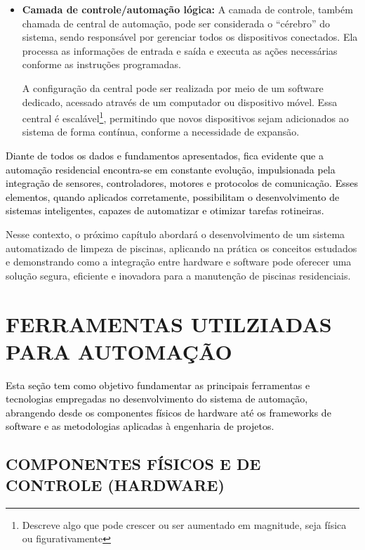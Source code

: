 \begin{itemize}
            \item \textbf{Camada de controle/automação lógica:} 
                A camada de controle, também chamada de central de automação, pode ser considerada o “cérebro” do sistema, sendo responsável por gerenciar todos os dispositivos conectados. Ela processa as informações de entrada e saída e executa as ações necessárias conforme as instruções programadas.
            
                A configuração da central pode ser realizada por meio de um software dedicado, acessado através de um computador ou dispositivo móvel. Essa central é escalável\footnote{Descreve algo que pode crescer ou ser aumentado em magnitude, seja física ou figurativamente}, permitindo que novos dispositivos sejam adicionados ao sistema de forma contínua, conforme a necessidade de expansão.
 
        \end{itemize}

    \textcolor{black}{Diante de todos os dados e fundamentos apresentados, fica evidente que a automação residencial encontra-se em constante evolução, impulsionada pela integração de sensores, controladores, motores e protocolos de comunicação. Esses elementos, quando aplicados corretamente, possibilitam o desenvolvimento de sistemas inteligentes, capazes de automatizar e otimizar tarefas rotineiras.}

    Nesse contexto, o próximo capítulo abordará o desenvolvimento de um sistema automatizado de limpeza de piscinas, aplicando na prática os conceitos estudados e demonstrando como a integração entre hardware e software pode oferecer uma solução segura, eficiente e inovadora para a manutenção de piscinas residenciais.

\section{FERRAMENTAS UTILZIADAS PARA AUTOMAÇÃO}

    \textcolor{black}{Esta seção tem como objetivo fundamentar as principais ferramentas e tecnologias empregadas no desenvolvimento do sistema de automação, abrangendo desde os componentes físicos de hardware até os frameworks de software e as metodologias aplicadas à engenharia de projetos.}

    \subsection{COMPONENTES FÍSICOS E DE CONTROLE (HARDWARE)}

